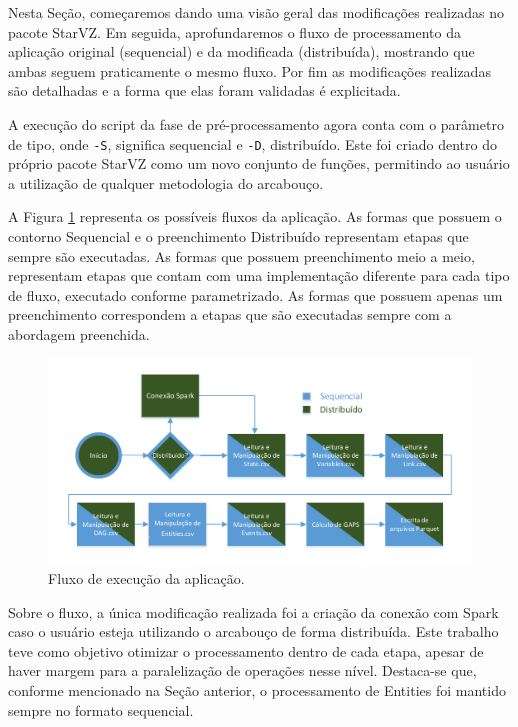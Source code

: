 Nesta Seção, começaremos dando uma visão geral das modificações realizadas no 
pacote StarVZ. Em seguida, aprofundaremos o fluxo de processamento da aplicação 
original (sequencial) e da modificada (distribuída), mostrando que ambas seguem 
praticamente o mesmo fluxo. Por fim as modificações realizadas são detalhadas e 
a forma que elas foram validadas é explicitada.

A execução do script da fase de pré-processamento agora conta com o parâmetro de 
tipo, onde \texttt{-S}, significa sequencial e \texttt{-D}, distribuído. Este 
foi criado dentro do próprio pacote StarVZ como um novo conjunto de funções, 
permitindo ao usuário a utilização de qualquer metodologia do arcabouço.

A Figura \ref{fig:spark-starvz-flow} representa os possíveis fluxos da 
aplicação.  As formas que possuem o contorno Sequencial e o preenchimento 
Distribuído representam etapas que sempre são executadas. As formas que possuem 
preenchimento meio a meio, representam etapas que contam com uma implementação 
diferente para cada tipo de fluxo, executado conforme parametrizado. As formas 
que possuem apenas um preenchimento correspondem a etapas que são executadas 
sempre com a abordagem preenchida.

\begin{figure}[H]
 \centerline{\includegraphics[width=1\textwidth]{./img/applicationflow.pdf}}
 \caption{Fluxo de execução da aplicação.}
 \label{fig:spark-starvz-flow}
\end{figure}

Sobre o fluxo, a única modificação realizada foi a criação da conexão com Spark 
caso o usuário esteja utilizando o arcabouço de forma distribuída. Este 
trabalho teve como objetivo otimizar o processamento dentro de cada 
etapa, apesar de haver margem para a paralelização de operações nesse nível. 
Destaca-se que, conforme mencionado na Seção anterior, o processamento de 
Entities foi mantido sempre no formato sequencial.

